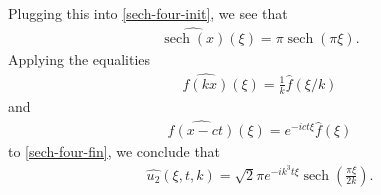 \documentclass[12pt,reqno]{amsart}
\numberwithin{equation}{section}  %
\newcommand{\wh}{\widehat}
\DeclareMathOperator{\sech}{sech}
\begin{document}
        Plugging this into \eqref{sech-four-init}, we see that
        \begin{equation}
          \label{sech-four-fin}
        \begin{split}
        \wh{\sech(x)}(\xi) = \pi \sech(\pi \xi).
        \end{split}
        \end{equation}
        Applying the equalities
        \begin{equation}
          \label{four-scale}
        \begin{split}
        \wh{f(kx)}(\xi) = \frac{1}{k}\wh{f}(\xi/k)
        \end{split}
        \end{equation}
        and
        \begin{equation}
          \label{time-trans}
        \begin{split}
          \wh{f(x-ct)}(\xi) = e^{-ict \xi} \wh{f}(\xi)
        \end{split}
        \end{equation}
        to \eqref{sech-four-fin}, we conclude that  
        \begin{equation}
          \label{mkdv-sol-four}
        \begin{split}
          \wh{u_{2}}(\xi, t, k) =
          \sqrt{2} \pi e^{-ik^{3}t \xi} \sech \left (\frac{\pi
          \xi}{2k} \right ).
        \end{split}
        \end{equation}
\end{document}
